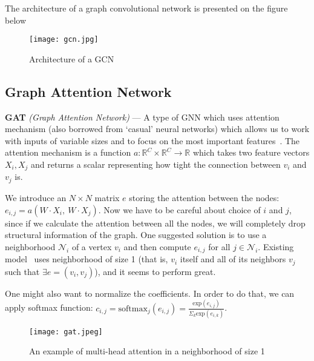 The architecture of a graph convolutional network is presented on the figure below~\cite{simplifying_gcn}
\begin{figure}[h]
	\centering
	\texttt{[image: gcn.jpg]}
	\caption{Architecture of a GCN}
\end{figure}

\subsection*{Graph Attention Network}

\textbf{GAT} \textit{(Graph Attention Network)} --- A type of GNN which uses attention mechanism (also borrowed from `casual' neural networks) which allows us to work with inputs of variable sizes and to focus on the most important features~\cite{Veličković_Cucurull_Casanova_Romero_Liò_Bengio_2018}.
The attention mechanism is a function $a: \mathbb{R}^C \times \mathbb{R}^C \rightarrow \mathbb{R}$ which takes two feature vectors $X_i, X_j$ and returns a scalar representing how tight the connection between $v_i$ and $v_j$ is.

We introduce an $N \times N$ matrix $e$ storing the attention between the nodes: $e_{i, j} = a\left( W \cdot X_i,\ W \cdot X_j \right)$.
Now we have to be careful about choice of $i$ and $j$, since if we calculate the attention between all the nodes, we will completely drop structural information of the graph.
One suggested solution is to use a neighborhood $\mathcal{N}_i$ of a vertex $v_i$ and then compute $e_{i, j}$ for all $j \in \mathcal{N}_i$.
Existing model~\cite{Veličković_Cucurull_Casanova_Romero_Liò_Bengio_2018} uses neighborhood of size 1 (that is, $v_i$ itself and all of its neighbors $v_j$ such that $\exists e = (v_i, v_j)$), and it seems to perform great.

One might also want to normalize the coefficients.
In order to do that, we can apply softmax function: $c_{i, j} = \text{softmax}_j \left( e_{i, j} \right) = \frac{\text{exp} \left( e_{i, j} \right)}{\Sigma_k \text{exp} \left( e_{i, k} \right) }$.

\begin{figure}[h]
	\centering
	\texttt{[image: gat.jpeg]}
	\caption{An example of multi-head attention in a neighborhood of size 1}
\end{figure}


